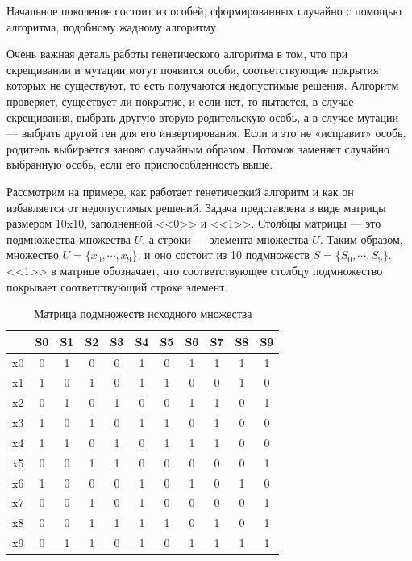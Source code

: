 Начальное поколение состоит из особей, сформированных случайно с помощью алгоритма, подобному жадному алгоритму.

Очень важная деталь работы генетического алгоритма в том, что при скрещивании и мутации могут появится особи, соответствующие покрытия которых не существуют, то есть получаются недопустимые решения. Алгоритм проверяет, существует ли покрытие, и если нет, то пытается, в случае скрещивания, выбрать другую вторую родительскую особь, а в случае мутации — выбрать другой ген для его инвертирования. Если и это не «исправит» особь, родитель выбирается заново случайным образом. Потомок заменяет случайно выбранную особь, если его приспособленность выше.

Рассмотрим на примере, как работает генетический алгоритм и как он избавляется от недопустимых решений. Задача представлена в виде матрицы размером 10x10, заполненной <<0>> и <<1>>. Столбцы матрицы — это подмножества  множества $U$, а строки --- элемента множества $U$. Таким образом, множество $U = \{x_0,\cdots,x_9\}$, и оно состоит из 10 подмножеств $S=\{S_0,\cdots,S_9\}$. <<1>> в матрице обозначает, что соответствующее столбцу подмножество покрывает соответствующий строке элемент.

\captionsetup{justification=raggedright, singlelinecheck=false}
\begin{table}[H]
	\centering
	\begin{threeparttable}
		\caption{\label{tbl:gaex}Матрица подмножеств исходного множества}
		\begin{tabular}{|c|c|c|c|c|c|c|c|c|c|c|}
			\hline
			&S0& S1& S2& S3& S4& S5& S6& S7& S8& S9 \\\hline
			x0& 0& 1& 0& 0& 1& 0& 1& 1& 1& 1\\\hline
			x1& 1& 0& 1& 0& 1& 1& 0& 0& 1& 0\\\hline
			x2& 0& 1& 0& 1& 0& 0& 1& 1& 0& 1\\\hline
			x3& 1& 0& 1& 0& 1& 1& 0& 1& 0& 0\\\hline
			x4& 1& 1& 0& 1& 0& 1& 1& 1& 0& 0\\\hline
			x5& 0& 0& 1& 1& 0& 0& 0& 0& 0& 1\\\hline
			x6& 1& 0& 0& 0& 1& 0& 1& 0& 1& 0\\\hline
			x7& 0& 0& 1& 0& 1& 0& 0& 0& 0& 1\\\hline
			x8& 0& 0& 1& 1& 1& 1& 0& 1& 0& 1\\\hline
			x9& 0& 1& 1& 0& 1& 0& 1& 1& 1& 1\\\hline
		\end{tabular}
	\end{threeparttable}
\end{table}



